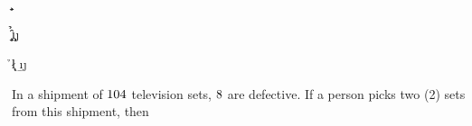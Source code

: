 


\FRACTIONSIMPLIFY\va\vb\a\b

\SUBTRACT{}\c
\SUBTRACT{}\d
\SUBTRACT\vb\va\x
\SUBTRACT{}\y

\FRACMULT\a\b\c\d\e\f

\va\vb\g\h
{}\c\d\i\j

\FRACMULT\g\h\va\d\k\l
\FRACMULT\a\b\i\j\m\n


\question In a shipment of $104$ television sets, $8$ are defective. If a person picks 
two (2) sets from this shipment, then

\watchout

\ifprintanswers
\fi 

